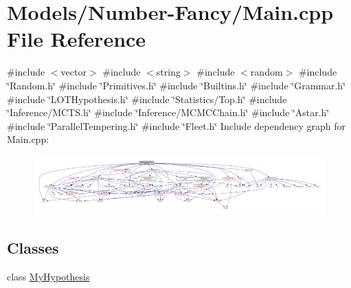 \hypertarget{_models_2_number-_fancy_2_main_8cpp}{}\section{Models/\+Number-\/\+Fancy/\+Main.cpp File Reference}
\label{_models_2_number-_fancy_2_main_8cpp}
{\ttfamily \#include $<$vector$>$}\newline
{\ttfamily \#include $<$string$>$}\newline
{\ttfamily \#include $<$random$>$}\newline
{\ttfamily \#include \char`\"{}Random.\+h\char`\"{}}\newline
{\ttfamily \#include \char`\"{}Primitives.\+h\char`\"{}}\newline
{\ttfamily \#include \char`\"{}Builtins.\+h\char`\"{}}\newline
{\ttfamily \#include \char`\"{}Grammar.\+h\char`\"{}}\newline
{\ttfamily \#include \char`\"{}L\+O\+T\+Hypothesis.\+h\char`\"{}}\newline
{\ttfamily \#include \char`\"{}Statistics/\+Top.\+h\char`\"{}}\newline
{\ttfamily \#include \char`\"{}Inference/\+M\+C\+T\+S.\+h\char`\"{}}\newline
{\ttfamily \#include \char`\"{}Inference/\+M\+C\+M\+C\+Chain.\+h\char`\"{}}\newline
{\ttfamily \#include \char`\"{}Astar.\+h\char`\"{}}\newline
{\ttfamily \#include \char`\"{}Parallel\+Tempering.\+h\char`\"{}}\newline
{\ttfamily \#include \char`\"{}Fleet.\+h\char`\"{}}\newline
Include dependency graph for Main.\+cpp\+:
\nopagebreak
\begin{figure}[H]
\begin{center}
\leavevmode
\includegraphics[width=350pt]{_models_2_number-_fancy_2_main_8cpp__incl}
\end{center}
\end{figure}
\subsection*{Classes}
\begin{DoxyCompactItemize}
\item 
class \hyperlink{class_my_hypothesis}{My\+Hypothesis}
\end{DoxyCompactItemize}
